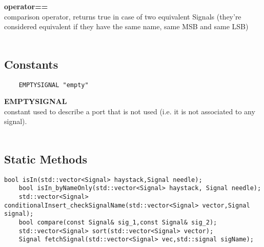 \documentclass{article}
\begin{document}
\textbf{operator==}\\
comparison operator, returns true in case of two equivalent Signals (they're considered equivalent if they have the same name, same MSB and same LSB)\\\\

\subsection{Constants}

\begin{mdframed}[hidealllines=true, backgroundcolor=green!10]
	\begin{lstlisting}
	EMPTYSIGNAL "empty"
	\end{lstlisting}
\end{mdframed}

\textbf{EMPTYSIGNAL}\\
constant used to describe a port that is not used (i.e. it is not associated to any signal).\\\\

\subsection{Static Methods}

\begin{mdframed}[hidealllines=true,backgroundcolor=green!10]
	\begin{lstlisting}[basicstyle=\tiny]
	bool isIn(std::vector<Signal> haystack,Signal needle);
	bool isIn_byNameOnly(std::vector<Signal> haystack, Signal needle);
	std::vector<Signal> conditionalInsert_checkSignalName(std::vector<Signal> vector,Signal signal);
	bool compare(const Signal& sig_1,const Signal& sig_2);
	std::vector<Signal> sort(std::vector<Signal> vector);
	Signal fetchSignal(std::vector<Signal> vec,std::signal sigName);
	\end{lstlisting}
\end{mdframed}
\end{document}
